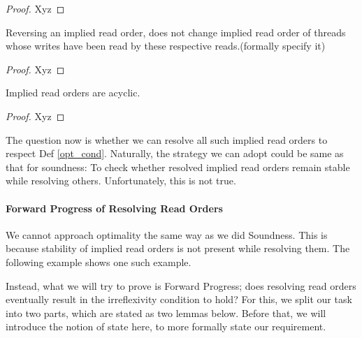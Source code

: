         \begin{proof}
            Xyz
        \end{proof}

        \begin{property}
            \label{iro-partial-stability}
            Reversing an implied read order, does not change implied read order of threads whose writes have been read by these respective reads.(formally specify it)
        \end{property}

        \begin{proof}
            Xyz
        \end{proof}

        \begin{property}
            \label{acyclic-iro}
            Implied read orders are acyclic.
        \end{property}

        \begin{proof}
            Xyz
        \end{proof}

        The question now is whether we can resolve all such implied read orders to respect Def \ref{opt_cond}. 
        Naturally, the strategy we can adopt could be same as that for soundness: To check whether resolved implied read orders remain stable while resolving others. 
        Unfortunately, this is not true.
    

    \paragraph{Forward Progress of Resolving Read Orders}

        We cannot approach optimality the same way as we did Soundness.
        This is because stability of implied read orders is not present while resolving them.
        The following example shows one such example. 
    

        Instead, what we will try to prove is Forward Progress; does resolving read orders eventually result in the irreflexivity condition to hold? 
        For this, we split our task into two parts, which are stated as two lemmas below. 
        Before that, we will introduce the notion of state here, to more formally state our requirement. 
        
